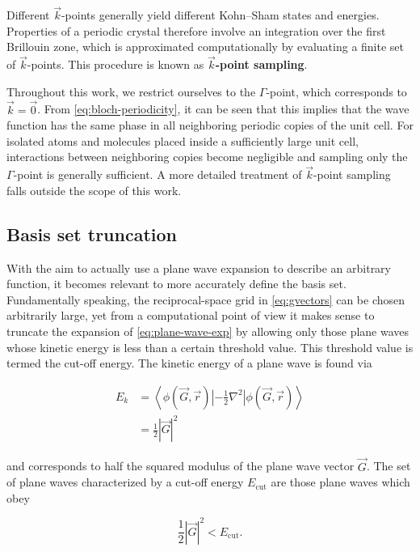 Different $\vec{k}$-points generally yield different Kohn--Sham states and energies. Properties of a periodic crystal therefore involve an integration over the first Brillouin zone, which is approximated computationally by evaluating a finite set of $\vec{k}$-points. This procedure is known as \textbf{$\vec{k}$-point sampling}.

Throughout this work, we restrict ourselves to the $\Gamma$-point, which corresponds to $\vec{k}=\vec{0}$. From \cref{eq:bloch-periodicity}, it can be seen that this implies that the wave function has the same phase in all neighboring periodic copies of the unit cell. For isolated atoms and molecules placed inside a sufficiently large unit cell, interactions between neighboring copies become negligible and sampling only the $\Gamma$-point is generally sufficient. A more detailed treatment of $\vec{k}$-point sampling falls outside the scope of this work.

%
%
%
\subsection{Basis set truncation}

With the aim to actually use a plane wave expansion to describe an arbitrary function, it becomes relevant to more accurately define the basis set. Fundamentally speaking, the reciprocal-space grid in \cref{eq:gvectors} can be chosen arbitrarily large, yet from a computational point of view it makes sense to truncate the expansion of \cref{eq:plane-wave-exp} by allowing only those plane waves whose kinetic energy is less than a certain threshold value. This threshold value is termed the cut-off energy. The kinetic energy of a plane wave is found via

\begin{align}
    E_{k} &= \left<\phi(\vec{G},\vec{r}) \left| -\frac{1}{2} \nabla^{2} \right|\phi(\vec{G},\vec{r})\right> \\
    &= \frac{1}{2} \left| \vec{G} \right|^{2}
    \label{eq:kin-en_pw}
\end{align}

and corresponds to half the squared modulus of the plane wave vector $\vec{G}$. The set of plane waves characterized by a cut-off energy $E_{\textrm{cut}}$ are those plane waves which obey

\begin{equation}
    \frac{1}{2} \left| \vec{G} \right|^{2} < E_{\textrm{cut}}.
\end{equation}

